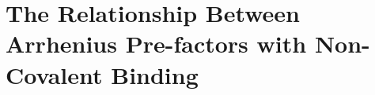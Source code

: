 
\chapter{The Relationship Between Arrhenius Pre-factors with Non-Covalent Binding}
\label{ch:arrhenius}
